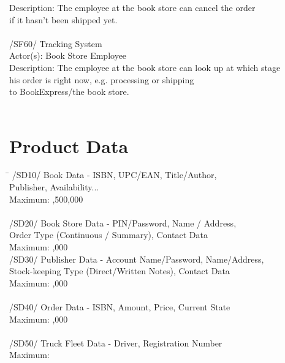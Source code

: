 \documentclass[a4paper,draft]{article}
\begin{document}
\begin{tabbing}
	 Description: \> The employee at the book store can cancel the order \\
	 \> if it hasn't been shipped yet. \\
	 \\
	 /SF60/ \> Tracking System \\
	 Actor(s): \> Book Store Employee \\
	 Description: \> The employee at the book store can look up at which stage \\
	 \> his order is right now, e.g. processing or shipping \\
	 \> to BookExpress/the book store.\\
	 \\
\end{tabbing} 
\clearpage
\section{Product Data}
\begin{tabbing}
\hspace{3cm}\=\kill
	/SD10/ \>  Book Data - ISBN, UPC/EAN, Title/Author, \\
	\> Publisher, Availability... \\
	Maximum: ,500,000 \\
	\\
	/SD20/ \> Book Store Data - PIN/Password, Name / Address,\\
	 \> Order Type (Continuous / Summary), Contact Data\\
	Maximum: ,000
	\\
	/SD30/ \> Publisher Data - Account Name/Password, Name/Address, \\
	\> Stock-keeping Type (Direct/Written Notes), Contact Data\\
	Maximum: ,000\\
	\\
	/SD40/ \> Order Data - ISBN, Amount, Price, Current State\\
	Maximum: ,000\\
	\\
	/SD50/ \> Truck Fleet Data - Driver, Registration Number\\
	Maximum: \\
	\\
\end{tabbing} 
\end{document}
